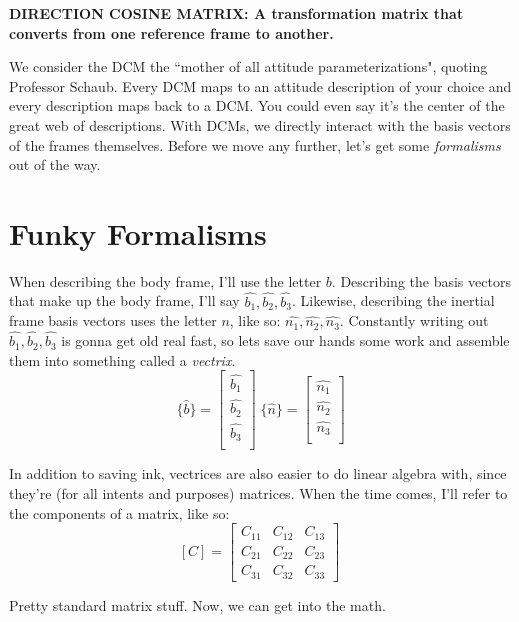 \documentclass[a4paper,14pt]{extreport}
\newcommand{\bv}[1]{\hat{b_{#1}}}
\newcommand{\nv}[1]{\hat{n_{#1}}}
\begin{document}
\begin{center}
\textbf{DIRECTION COSINE MATRIX: A transformation matrix that converts from one reference frame to another.}
\end{center}

We consider the DCM the ``mother of all attitude parameterizations", quoting Professor Schaub. Every DCM maps to an attitude description of your choice and every description maps back to a DCM. You could even say it's the center of the great web of descriptions. With DCMs, we directly interact with the basis vectors of the frames themselves. Before we move any further, let's get some \emph{formalisms} out of the way.
\section{Funky Formalisms}
When describing the body frame, I'll use the letter $b$. Describing the basis vectors that make up the body frame, I'll say $\bv{1}, \bv{2}, \bv{3}$. Likewise, describing the inertial frame basis vectors uses the letter $n$, like so: $\nv{1}, \nv{2}, \nv{3}$. Constantly writing out $\bv{1}, \bv{2}, \bv{3}$ is gonna get old real fast, so lets save our hands some work and assemble them into something called a \emph{vectrix}.
\[
\{\hat{b}\} = 
\begin{bmatrix}
\bv{1}\\ \bv{2}\\ \bv{3}\\
\end{bmatrix}\;
\{\hat{n}\} = 
\begin{bmatrix}
\nv{1}\\ \nv{2}\\ \nv{3}\\
\end{bmatrix}
\] 

In addition to saving ink, vectrices are also easier to do linear algebra with, since they're (for all intents and purposes) matrices. When the time comes, I'll refer to the components of a matrix, like so:
\[
[C] = \begin{bmatrix}
C_{11}&C_{12}&C_{13}\\
C_{21}&C_{22}&C_{23}\\
C_{31}&C_{32}&C_{33}
\end{bmatrix}\
\]

Pretty standard matrix stuff. Now, we can get into the math.
\end{document}
